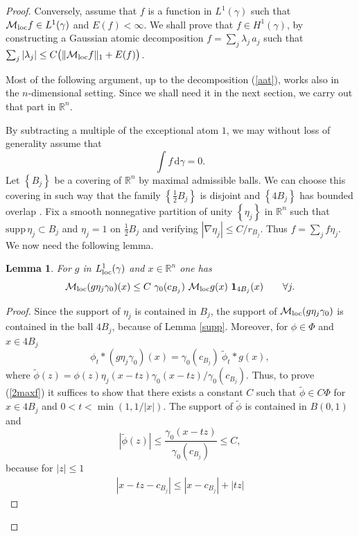 \documentclass{amsart}                 %
\newtheorem{lemma}[theorem]{Lemma}
\numberwithin{equation}{section}
\newcommand\set[1]{{\left\{#1\right\}}}
\renewcommand\mod[1]{\left\vert{#1}\right\vert}
\newcommand\norm[2]{{\Vert{#1}\Vert_{#2}}}
\newcommand\wrt{\,\mathrm{d}}
\newcommand\1{{\bf 1}}
\newcommand\BR{\mathbb{R}} \newcommand\BRd{\mathbb{R}^d}
\newcommand\cM{\mathcal{M}}  \newcommand\fM{\mathfrak{M}}
\newcommand\mlo {\cM_{\textnormal{loc}}}
\newcommand\supp{\mathrm{supp}\,}
\begin{document}
\begin{proof}
Conversely, assume that $f$ is a function in $L^1(\gamma)$ such that 
$\mlo f\in L^1(\gamma)$ and $E(f)<\infty$. We shall prove that $f\in 
H^1(\gamma)$, by constructing a Gaussian atomic decomposition $f=
\sum_j\lambda_j\,a_j$ such that $\sum_j \mod{\lambda_j}\le C \big
(\norm{\mlo f}{1}+E(f)\big)$. 
\par
Most of the following argument, up to the decomposition (\ref{aat}), works also in 
the $n$-dimensional setting. Since we shall need it in the next section, 
we carry out that part in $\BR^n$.\par
By subtracting a multiple of the exceptional atom $1$, we may without
loss of generality
assume that 
\begin{equation}\label{int0}
\int f\wrt\gamma=0.
\end{equation}
Let $\set{B_j}$ be a covering of $\BR^n$ by maximal admissible balls. We 
can choose this covering in such way that  the family $\set{\frac12 B_j}$ 
is disjoint and $\set{4 B_j}$ has bounded overlap  
\cite[Lemma 2.4]{GMST1}. Fix a smooth nonnegative partition of unity 
$\set{\eta_j}$ in $\BR^n$ such that 
$\supp \eta_j \subset B_j$ and $\eta_j=1$ on $\tfrac{1}{2}B_j$ and verifying $
\mod{\nabla\eta_j}\le C/r_{B_j}$. Thus $f=\sum_j f
\eta_j$. We now need the following lemma.
\par
\begin{lemma}\label{Lemma1}
For $g$ in $L^1_{\rm loc}(\gamma)$ and $x \in\BR^n$ one has
\begin{equation}\label{2maxf}
\mlo (g\eta_j\gamma_0)(x)\le C\ \gamma_0(c_{B_j})\ \mlo g(x)\  \1_{4 
B_j}
(x)\qquad \forall j.
\end{equation}
\end{lemma} 
\begin{proof}
Since the support of $\eta_j$ is contained in $B_j$, the support of 
$\mlo (g\eta_j\gamma_0)$ is contained in the ball $4B_j$, because of
Lemma  \ref{supp}. Moreover, for $\phi\in\Phi$ and
$x \in 4B_j$
$$
\phi_t*(g\eta_j\gamma_0)(x)=\gamma_0(c_{B_j})\ \tilde{\phi}_t*g(x),
$$
where $\tilde{\phi}(z)=\phi(z)\eta_j(x-tz)\gamma_0(x-tz)/\gamma_0(c_
{B_j})$. Thus, 
to prove (\ref{2maxf}) it suffices to show that there exists a constant 
$C$ 
such that $\tilde{\phi}\in C\Phi$ for  $x\in 4B_j$ and 
$0<t < \min(1, 1/\mod{x})$. The support of $\tilde{\phi}$ is 
contained 
in $B(0,1)$ and 
$$
\mod{\tilde{\phi}(z)}\le \frac{\gamma_0(x-tz)}{\gamma_0(c_{B_j})}\le C,
$$
because for $|z| \le 1$
\begin{align*}
\mod{x-tz-c_{B_j}}\le \mod{x-c_{B_j}}+\mod{tz}

\end{align*}
\end{proof}
\end{proof}
\end{document}
